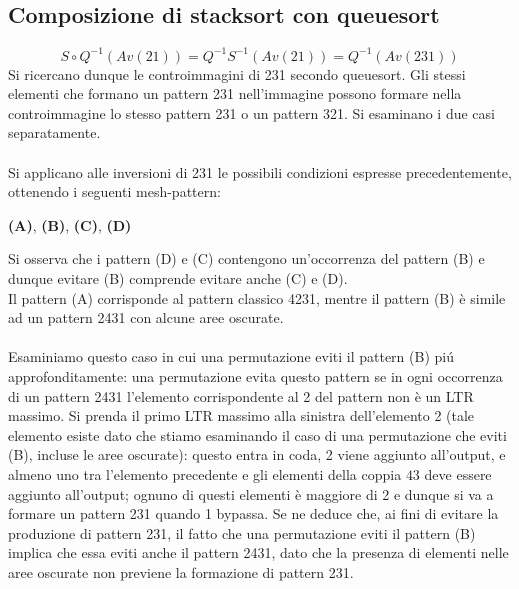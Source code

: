 \subsection{Composizione di {stacksort} con {queuesort}}
$$S\circ Q^{-1}(Av(21)) = Q^{-1}S^{-1}(Av(21)) = Q^{-1}(Av(231))$$
Si ricercano dunque le controimmagini di 231 secondo queuesort. Gli stessi elementi che formano un pattern 231 nell'immagine possono formare nella controimmagine lo stesso pattern 231 o un pattern 321. Si esaminano i due casi separatamente.\\\\
Si applicano alle inversioni di 231 le possibili condizioni espresse precedentemente, ottenendo i seguenti mesh-pattern:
\begin{center}
\textbf{(A)},
\textbf{(B)},
\textbf{(C)},
\textbf{(D)}
\end{center}
Si osserva che i pattern (D) e (C) contengono un'occorrenza del pattern (B) e dunque evitare (B) comprende evitare anche (C) e (D).\\
Il pattern (A) corrisponde al pattern classico 4231, mentre il pattern (B) \`e simile ad un pattern 2431 con alcune aree oscurate.\\\\
Esaminiamo questo caso in cui una permutazione eviti il pattern (B) pi\'u approfonditamente: una permutazione evita questo pattern se in ogni occorrenza di un pattern 2431 l'elemento corrispondente al 2 del pattern non \`e un LTR massimo. Si prenda il primo LTR massimo alla sinistra dell'elemento 2 (tale elemento esiste dato che stiamo esaminando il caso  di una permutazione che eviti (B), incluse le aree oscurate): questo entra in coda, 2 viene aggiunto all'output, e almeno uno tra l'elemento precedente e gli elementi della coppia $43$ deve essere aggiunto all'output; ognuno di questi elementi \`e maggiore di 2 e dunque si va a formare un pattern 231 quando 1 bypassa. Se ne deduce che, ai fini di evitare la produzione di pattern 231, il fatto che una permutazione eviti il pattern (B) implica che essa eviti anche il pattern 2431, dato che la presenza di elementi nelle aree oscurate non previene la formazione di pattern 231.\\\\
